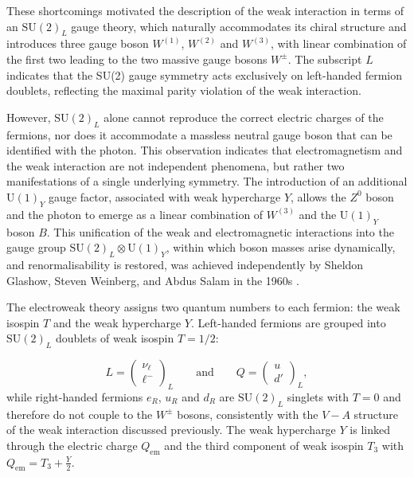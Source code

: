 \vspace{0.5 cm}

These shortcomings motivated the description of the weak interaction in terms of an $\mathrm{SU}(2)_L$ gauge theory, which naturally accommodates its chiral structure and introduces three gauge boson $W^{(1)}$, $W^{(2)}$ and $W^{(3)}$, with linear combination of the first two leading to the two massive gauge bosons $W^\pm$. The subscript $L$ indicates that the SU(2) gauge symmetry acts exclusively on left-handed fermion doublets, reflecting the maximal parity violation of the weak interaction.

However, $\mathrm{SU}(2)_L$ alone cannot reproduce the correct electric charges of the fermions, nor does it accommodate a massless neutral gauge boson that can be identified with the photon. This observation indicates that electromagnetism and the weak interaction are not independent phenomena, but rather two manifestations of a single underlying symmetry. The introduction of an additional $\mathrm{U}(1)_Y$ gauge factor, associated with weak hypercharge $Y$, allows the $Z^0$ boson and the photon to emerge as a linear combination of $W^{(3)}$ and the $\mathrm{U}(1)_Y$ boson $B$. This unification of the weak and electromagnetic interactions into the gauge group $\mathrm{SU}(2)_L \otimes \mathrm{U}(1)_Y$, within which boson masses arise dynamically, and renormalisability is restored, was achieved independently by Sheldon Glashow, Steven Weinberg, and Abdus Salam in the 1960s \cite{Glashow1961, Weinberg1967, Salam1968}.

\vspace{0.5 cm}

The electroweak theory assigns two quantum numbers to each fermion: the weak isospin $T$ and the weak hypercharge $Y$. Left-handed fermions are grouped into $\mathrm{SU}(2)_L$ doublets of weak isospin $T = 1/2$:

\begin{equation}
    L = \begin{pmatrix} \nu_\ell \\ \ell^- \end{pmatrix}_L \qquad \mathrm{and} \qquad
    Q = \begin{pmatrix} u \\ d' \end{pmatrix}_L,
\end{equation}
while right-handed fermions $e_R$, $u_R$ and $d_R$ are $\mathrm{SU}(2)_L$ singlets with $T = 0$ and therefore do not couple to the $W^\pm$ bosons, consistently with the $V-A$ structure of the weak interaction discussed previously. The weak hypercharge $Y$ is linked through the electric charge $Q_{\mathrm{em}}$ and the third component of weak isospin $T_3$ with $Q_{\mathrm{em}} = T_3 + \frac{Y}{2}$.

